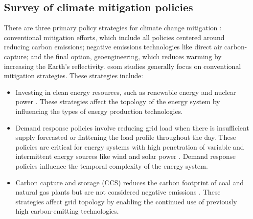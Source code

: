 \subsection{Survey of climate mitigation policies}

There are three primary policy strategies for climate change mitigation \cite{fawzy_strategies_2020}:
conventional mitigation efforts, which include all policies centered around
reducing carbon emissions; negative emissions technologies like direct air carbon-
capture; and the final option, geoengineering, which reduces warming by increasing
the Earth’s reflectivity. \gls{esom} studies generally focus on conventional mitigation
strategies. These strategies include:
\begin{itemize}
  \item Investing in clean energy resources, such as renewable energy and nuclear power
  \cite{fawzy_strategies_2020}. These strategies affect the topology of the energy
  system by influencing the types of energy production technologies.
  \item Demand response policies involve reducing grid load when there is insufficient
  supply forecasted or flattening the load profile throughout the day. These policies
  are critical for energy systems with high penetration of variable and intermittent
  energy sources like wind and solar power \cite{bouckaert_expanding_2014,
  kuzemko_policies_2017}. Demand response policies influence the temporal
  complexity of the energy system.
  \item Carbon capture and storage (CCS) reduces the carbon footprint of coal and
  natural gas plants but are not considered negative emissions \cite{fawzy_strategies_2020}.
  These strategies affect grid topology by enabling the continued use of previously
  high carbon-emitting technologies.
\end{itemize}

